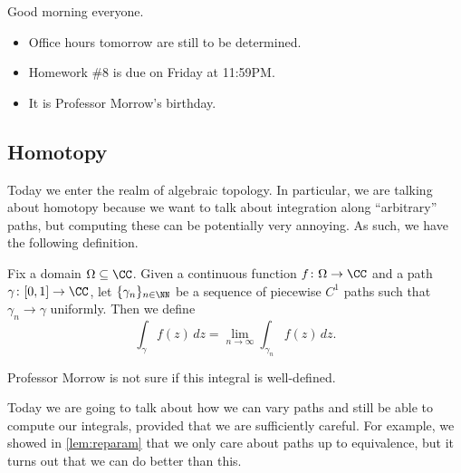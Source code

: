 \documentclass[../notes.tex]{subfiles}
\begin{document}

Good morning everyone.
\begin{itemize}
	\item Office hours tomorrow are still to be determined.
	\item Homework \#8 is due on Friday at 11:59PM.
	\item It is Professor Morrow's birthday.
\end{itemize}

\subsection{Homotopy}
Today we enter the realm of algebraic topology. In particular, we are talking about homotopy because we want to talk about integration along ``arbitrary'' paths, but computing these can be potentially very annoying.
\usepiecewisecone*
As such, we have the following definition.
\begin{definition}
	Fix a domain $\Omega\subseteq\CC$. Given a continuous function $f\colon \Omega\to\CC$ and a path $\gamma\colon [0,1]\to\CC$, let $\{\gamma_n\}_{n\in\NN}$ be a sequence of piecewise $C^1$ paths such that $\gamma_n\to\gamma$ uniformly. Then we define
	\[\int_\gamma f(z)\,dz=\lim_{n\to\infty}\int_{\gamma_n}f(z)\,dz.\]
\end{definition}
\begin{remark}
	Professor Morrow is not sure if this integral is well-defined.
\end{remark}
Today we are going to talk about how we can vary paths and still be able to compute our integrals, provided that we are sufficiently careful. For example, we showed in \autoref{lem:reparam} that we only care about paths up to equivalence, but it turns out that we can do better than this.
\end{document}
